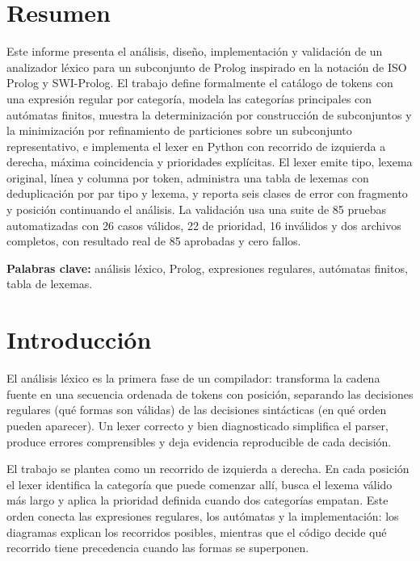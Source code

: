 \documentclass[11pt,letterpaper]{article}
\begin{document}
\section*{Resumen}

Este informe presenta el análisis, diseño, implementación y validación de un analizador léxico para un subconjunto de Prolog inspirado en la notación de ISO Prolog y SWI-Prolog. El trabajo define formalmente el catálogo de tokens con una expresión regular por categoría, modela las categorías principales con autómatas finitos, muestra la determinización por construcción de subconjuntos y la minimización por refinamiento de particiones sobre un subconjunto representativo, e implementa el lexer en Python con recorrido de izquierda a derecha, máxima coincidencia y prioridades explícitas. El lexer emite tipo, lexema original, línea y columna por token, administra una tabla de lexemas con deduplicación por par tipo y lexema, y reporta seis clases de error con fragmento y posición continuando el análisis. La validación usa una suite de 85 pruebas automatizadas con 26 casos válidos, 22 de prioridad, 16 inválidos y dos archivos completos, con resultado real de 85 aprobadas y cero fallos.

\textbf{Palabras clave:} análisis léxico, Prolog, expresiones regulares, autómatas finitos, tabla de lexemas.

\section{Introducción}

El análisis léxico es la primera fase de un compilador: transforma la cadena fuente en una secuencia ordenada de tokens con posición, separando las decisiones regulares (qué formas son válidas) de las decisiones sintácticas (en qué orden pueden aparecer). Un lexer correcto y bien diagnosticado simplifica el parser, produce errores comprensibles y deja evidencia reproducible de cada decisión.

El trabajo se plantea como un recorrido de izquierda a derecha. En cada posición el lexer identifica la categoría que puede comenzar allí, busca el lexema válido más largo y aplica la prioridad definida cuando dos categorías empatan. Este orden conecta las expresiones regulares, los autómatas y la implementación: los diagramas explican los recorridos posibles, mientras que el código decide qué recorrido tiene precedencia cuando las formas se superponen.
\end{document}
